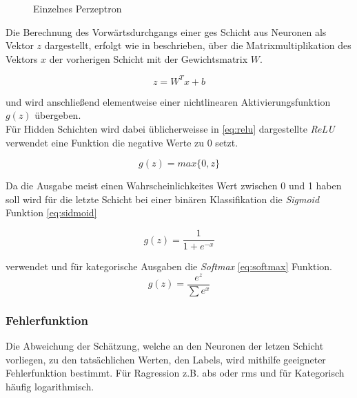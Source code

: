 \begin{figure}[h]
    \centering
    \label{fig:neuron}
    
    \caption{Einzelnes Perzeptron}
\end{figure}






Die Berechnung des Vorwärtsdurchgangs einer ges Schicht aus Neuronen
als Vektor $z$ dargestellt, erfolgt wie in \cite{goodfellowDeepLearning2016a}
beschrieben, über die Matrixmultiplikation des Vektors
$x$ der vorherigen Schicht mit der Gewichtsmatrix $W$.

\begin{equation}
    \label{eq:forward}
    z = W^{T}x+b
\end{equation}

und wird anschließend elementweise einer nichtlinearen Aktivierungsfunktion
$g(z)$ übergeben.\\
Für Hidden Schichten wird dabei üblicherweisse in \ref{eq:relu} dargestellte
\textit{ReLU} verwendet eine Funktion die negative Werte zu 0 setzt.

\begin{equation}
    \label{eq:relu}
    g(z) = max\{0,z\}
\end{equation}

Da die Ausgabe meist einen Wahrscheinlichkeites Wert zwischen 0 und 1 
haben soll wird für die letzte Schicht bei einer binären Klassifikation 
die \textit{Sigmoid} Funktion \ref{eq:sidmoid}

\begin{equation}
    \label{eq:sidmoid}
    g(z) = \frac{1}{1 + e^{-x}}
\end{equation}

verwendet und für kategorische Ausgaben die \textit{Softmax} \ref{eq:softmax}
Funktion.
\begin{equation}
    \label{eq:softmax}
    g(z) = \frac{e^{z}}{\sum e^{x}}
\end{equation}



\subsubsection{Fehlerfunktion}
Die Abweichung der Schätzung, welche an den Neuronen der letzen Schicht 
vorliegen, zu den tatsächlichen Werten, den Labels, wird mithilfe geeigneter 
Fehlerfunktion bestimmt. Für Ragression z.B. abs oder rms und für Kategorisch
häufig logarithmisch.

